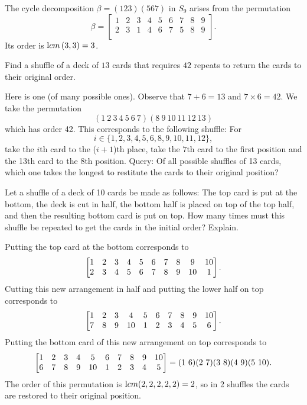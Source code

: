 \begin{exa}
The cycle decomposition $\beta = (123)(567)$ in $S_9$ arises from
the permutation
$$\beta = \begin{bmatrix}1 & 2 & 3 & 4 & 5 & 6 & 7 & 8 & 9 \\
2 & 3 & 1 & 4 & 6 & 7 & 5 & 8 & 9 \\ \end{bmatrix}.$$ Its order is
${\mathrm lcm}\left(3,3\right) = 3$. \label{ex:beta}\end{exa}
\begin{exa}

Find a shuffle of a deck of $13$ cards that requires $42$ repeats
to return the cards to their original order.
\end{exa}
\begin{solu}Here is one (of many possible ones). Observe that $7 + 6
= 13$ and $7\times 6 = 42$. We take the permutation
$$(1\ 2\ 3\ 4\ 5\ 6\ 7)(8\ 9\ 10\ 11\ 12\ 13)$$which has order 42.
This corresponds to the following shuffle: For $$i\in \{1, 2, 3,
4, 5, 6, 8, 9, 10, 11, 12\},$$ take the $i$th card to the ($i +
1$)th place, take the $7$th card to the first position and the
13th card to the $8$th position. Query: Of all possible shuffles
of 13 cards, which one takes the longest to restitute the cards to
their original position?
\end{solu}
\begin{exa}
Let a shuffle of a deck of 10 cards be made as follows: The top
card is put at the bottom, the deck is cut in half, the bottom
half is placed on top of the top half, and then the resulting
bottom card is put on top. How many times must this shuffle be
repeated to get the cards in the initial order? Explain.
\end{exa}
\begin{solu}Putting the top card at the bottom corresponds to
$$\begin{bmatrix} 1 & 2 & 3 & 4 & 5 & 6 & 7  & 8 & 9 & 10\cr
2 & 3 & 4 & 5 & 6 & 7  & 8 & 9 & 10 & 1 \cr
\end{bmatrix}.
$$ Cutting this new arrangement in half and putting the lower half on top corresponds to
$$\begin{bmatrix} 1 & 2 & 3 & 4 & 5 & 6 & 7  & 8 & 9 & 10\cr
 7  & 8 & 9 & 10 & 1 & 2 & 3 & 4 & 5 & 6 \cr
\end{bmatrix}.
$$
Putting the bottom card of this new arrangement on top corresponds
to
$$\begin{bmatrix} 1 & 2 & 3 & 4 & 5 & 6 & 7  & 8 & 9 & 10\cr
  6 & 7  & 8 & 9 & 10 & 1 & 2 & 3 & 4 & 5  \cr
\end{bmatrix} = (1\ 6)(2\ 7)(3\ 8)(4\ 9)(5\ 10).
$$The order of this permutation is ${\textrm  lcm} (2, 2, 2, 2, 2) = 2$, so
in 2 shuffles the cards are restored to their original position.
\end{solu}
